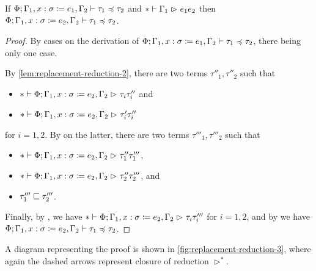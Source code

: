 \begin{lemma} \label{lem:replacement-reduction-3}
If $\subtype{\Phi; \Gamma_1, \define{x}{\sigma}{e_1}, \Gamma_2}{\tau_1}{\tau_2}$
and $\red*{\Gamma_1}{e_1}{e_2}$
then $\subtype{\Phi; \Gamma_1, \define{x}{\sigma}{e_2}, \Gamma_2}{\tau_1}{\tau_2}$.
\end{lemma}

\begin{proof}
By cases on the derivation of
$\subtype{\Phi; \Gamma_1, \define{x}{\sigma}{e_1}, \Gamma_2}{\tau_1}{\tau_2}$,
there being only one case.
\begin{mathpar}
\end{mathpar}
By \cref{lem:replacement-reduction-2}, there are two terms $\tau''_1, \tau''_2$ such that
\begin{itemize}[noitemsep]
  \item $\red*{\Phi; \Gamma_1, \define{x}{\sigma}{e_2}, \Gamma_2}{\tau_i}{\tau''_i}$ and
  \item $\red*{\Phi; \Gamma_1, \define{x}{\sigma}{e_2}, \Gamma_2}{\tau'_i}{\tau''_i}$
\end{itemize}
for $i = 1, 2$.
By  on the latter, there are two terms $\tau'''_1, \tau'''_2$ such that
\begin{itemize}[noitemsep]
  \item $\red*{\Phi; \Gamma_1, \define{x}{\sigma}{e_2}, \Gamma_2}{\tau''_1}{\tau'''_1}$,
  \item $\red*{\Phi; \Gamma_1, \define{x}{\sigma}{e_2}, \Gamma_2}{\tau''_2}{\tau'''_2}$, and
  \item $\acum{\tau'''_1}{\tau'''_2}$.
\end{itemize}
Finally, by , we have
$\red*{\Phi; \Gamma_1, \define{x}{\sigma}{e_2}, \Gamma_2}{\tau_i}{\tau'''_i}$
for $i = 1, 2$,
and by  we have
$\subtype{\Phi; \Gamma_1, \define{x}{\sigma}{e_2}, \Gamma_2}{\tau_1}{\tau_2}$.
\end{proof}

A diagram representing the proof is shown in \cref{fig:replacement-reduction-3},
where again the dashed arrows represent closure of reduction $\rhd^*$.

